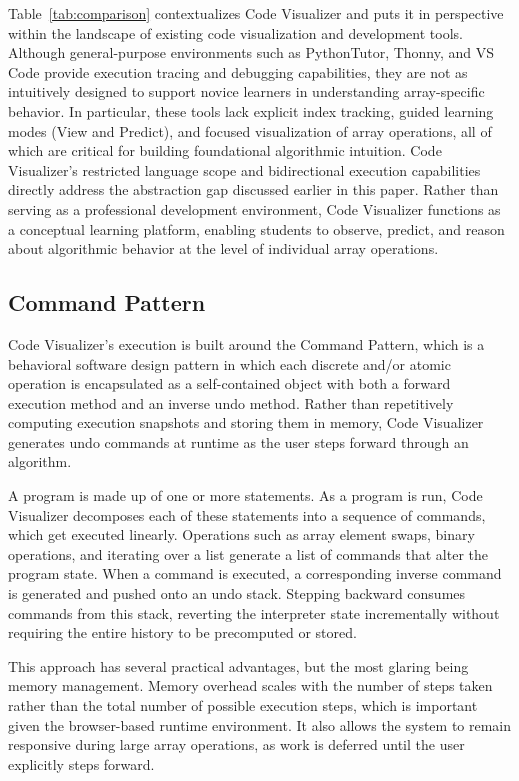 \documentclass{IEEEtran}
\begin{document}
Table~\ref{tab:comparison} contextualizes Code Visualizer and puts it in perspective within the landscape of existing code visualization and development tools. Although general-purpose environments such as PythonTutor, Thonny, and VS Code provide execution tracing and debugging capabilities, they are not as intuitively designed to support novice learners in understanding array-specific behavior. In particular, these tools lack explicit index tracking, guided learning modes (View and Predict), and focused visualization of array operations, all of which are critical for building foundational algorithmic intuition. Code Visualizer's restricted language scope and bidirectional execution capabilities directly address the abstraction gap discussed earlier in this paper. Rather than serving as a professional development environment, Code Visualizer functions as a conceptual learning platform, enabling students to observe, predict, and reason about algorithmic behavior at the level of individual array operations.
\subsection{Command Pattern}
Code Visualizer's execution is built around the Command Pattern, which is a behavioral software design pattern in which each discrete and/or atomic operation is encapsulated as a self-contained object with both a forward execution method and an inverse undo method. Rather than repetitively computing execution snapshots and storing them in memory, Code Visualizer generates undo commands at runtime as the user steps forward through an algorithm.

A program is made up of one or more statements. As a program is run, Code Visualizer decomposes each of these statements into a sequence of commands, which get executed linearly. Operations such as array element swaps, binary operations, and iterating over a list generate a list of commands that alter the program state. When a command is executed, a corresponding inverse command is generated and pushed onto an undo stack. Stepping backward consumes commands from this stack, reverting the interpreter state incrementally without requiring the entire history to be precomputed or stored.

This approach has several practical advantages, but the most glaring being memory management. Memory overhead scales with the number of steps taken rather than the total number of possible execution steps, which is important given the browser-based runtime environment. It also allows the system to remain responsive during large array operations, as work is deferred until the user explicitly steps forward.
\end{document}
